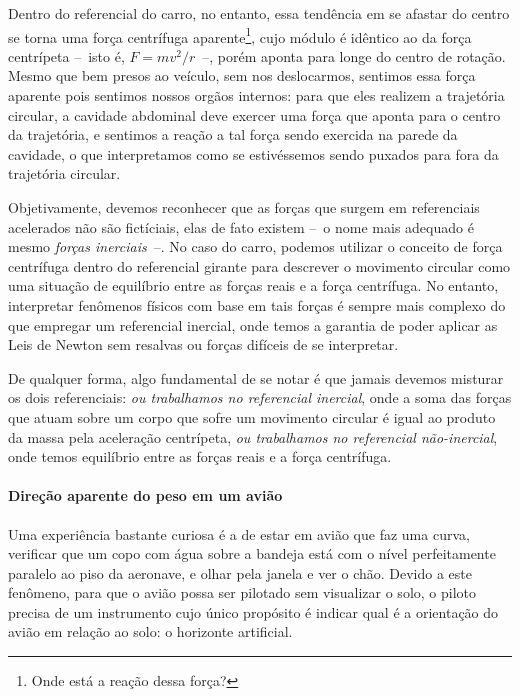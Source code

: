 Dentro do referencial do carro, no entanto, essa tendência em se afastar do centro se torna uma força centrífuga aparente\footnote{Onde está a reação dessa força?}, cujo módulo é idêntico ao da força centrípeta --~isto é, $F = mv^2/r$~--, porém aponta para longe do centro de rotação. Mesmo que bem presos ao veículo, sem nos deslocarmos, sentimos essa força aparente pois sentimos nossos orgãos internos: para que eles realizem a trajetória circular, a cavidade abdominal deve exercer uma força que aponta para o centro da trajetória, e sentimos a reação a tal força sendo exercida na parede da cavidade, o que interpretamos como se estivéssemos sendo puxados para fora da trajetória circular.

Objetivamente, devemos reconhecer que as forças que surgem em referenciais acelerados não são fictíciais, elas de fato existem --~o nome mais adequado é mesmo \emph{forças inerciais}~--. No caso do carro, podemos utilizar o conceito de força centrífuga dentro do referencial girante para descrever o movimento circular como uma situação de equilíbrio entre as forças reais e a força centrífuga. No entanto, interpretar fenômenos físicos com base em tais forças é sempre mais complexo do que empregar um referencial inercial, onde temos a garantia de poder aplicar as Leis de Newton sem resalvas ou forças difíceis de se interpretar.

De qualquer forma, algo fundamental de se notar é que jamais devemos misturar os dois referenciais: \emph{ou trabalhamos no referencial inercial}, onde a soma das forças que atuam sobre um corpo que sofre um movimento circular é igual ao produto da massa pela aceleração centrípeta, \emph{ou trabalhamos no referencial não-inercial}, onde temos equilíbrio entre as forças reais e a força centrífuga.

\paragraph{Direção aparente do peso em um avião}

Uma experiência bastante curiosa é a de estar em avião que faz uma curva, verificar que um copo com água sobre a bandeja está com o nível perfeitamente paralelo ao piso da aeronave, e olhar pela janela e ver o chão. Devido a este fenômeno, para que o avião possa ser pilotado sem visualizar o solo, o piloto precisa de um instrumento cujo único propósito é indicar qual é a orientação do avião em relação ao solo: o horizonte artificial.


